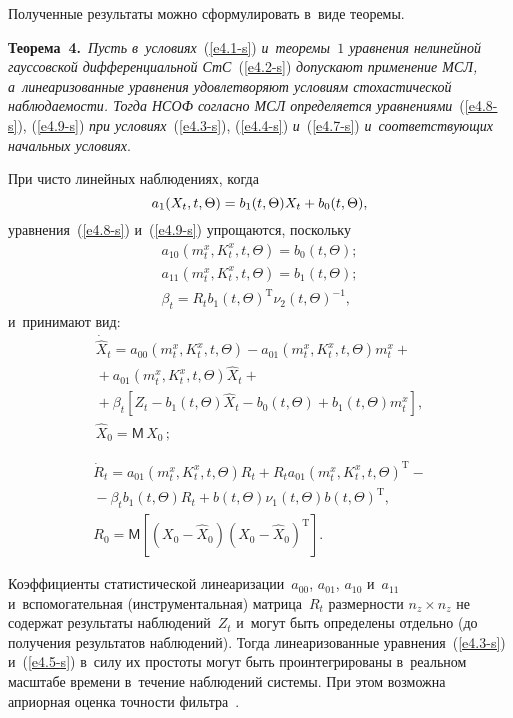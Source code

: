 \begin{multicols}{2}
Полученные результаты можно сформулировать в~виде теоремы.

\smallskip

\noindent
\textbf{Теорема~4.}\ \textit{Пусть в~условиях}~(\ref{e4.1-s}) \textit{и~теоремы~$1$ 
уравнения нелинейной гауссовской
дифференциальной СтС}~(\ref{e4.2-s}) \textit{допускают применение МСЛ, 
а~линеаризованные уравнения удовлетворяют условиям стохастической
наблюдаемости. Тогда НСОФ согласно МСЛ
определяется уравнениями}~(\ref{e4.8-s}), (\ref{e4.9-s}) \textit{при условиях}~(\ref{e4.3-s}), 
(\ref{e4.4-s}) \textit{и}~(\ref{e4.7-s}) \textit{и~соответствующих начальных
условиях}.


\smallskip

При чисто линейных наблюдениях, когда  
$$
a_1 (X_t, t,\Theta) = b_1(t,\Theta)
X_t  +b_0(t,\Theta),
$$
 уравнения~(\ref{e4.8-s}) и~(\ref{e4.9-s}) упрощаются,
поскольку 
\begin{gather*}
a_{10}\left(m_t^x, K_t^x, t,\Theta\right)= b_0(t,\Theta);\\
a_{11}\left(m_t^x, K_t^x, t,\Theta\right)= b_1(t,\Theta);\\
\beta_t = R_t b_1 (t,\Theta)^{\mathrm{T}}\nu_2 (t,\Theta)^{-1},
\end{gather*}
 и~принимают вид:
\begin{multline*}
{\dot{\hat X}}_t =a_{00} \left(m_t^x, K_t^x, t,\Theta\right) -
a_{01}\left(m_t^x, K_t^x, t,\Theta\right) m_t^x     + {}\\
{}+
a_{01}\left(m_t^x, K_t^x, t,\Theta\right)\hat X_t+{}\\
{}+ \beta_t \left[ Z_t - b_1(t,\Theta) \hat X_t - b_0 (t,\Theta) + 
b_1(t,\Theta) m_t^x \right],\\ \hat X_0 = \mathsf{M}\,X_0\,;
\end{multline*}

\vspace*{-12pt}

\noindent
\begin{multline*}
\!\!\!\!\dot R_t =a_{01} \left(m_t^x, K_t^x, t,\Theta\right) R_t + 
R_t a_{01}\left(m_t^x, K_t^x, t,\Theta\right)^{\mathrm{T}} -{}\\
{}- \beta_t  b_1 (t,\Theta) R_t +b(t,\Theta)\nu_1(t,\Theta) b(t,\Theta)^{\mathrm{T}},
\\
R_0 =\mathsf{M} \left[ \left(X_0-\hat X_0\right) \left(X_0-\hat X_0\right)^{\mathrm{T}}\right].
\end{multline*}

Коэффициенты статистической линеаризации~$a_{00}$,
$a_{01}$, $a_{10}$ и~$a_{11}$ и~вспомогательная
(инструментальная) матрица~$R_t$ размерности  $n_z\times n_z$ не
содержат результаты наблюдений~$Z_t$ и~могут быть определены
отдельно (до получения результатов наблюдений). Тогда
линеаризованные уравнения~(\ref{e4.3-s}) и~(\ref{e4.5-s}) в~силу их простоты
могут быть проинтегрированы в~реальном масштабе времени в~течение
наблюдений системы. При этом возможна априорная оценка точ\-ности
 фильтра~\cite{10-s}.



\end{multicols}

